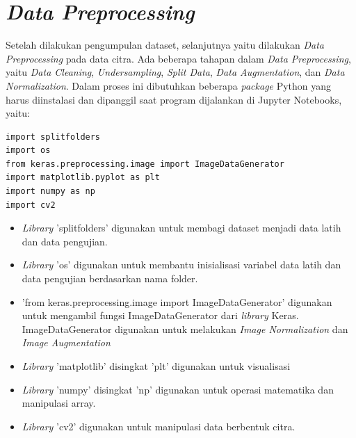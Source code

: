 \section{\textit{Data Preprocessing}}
Setelah dilakukan pengumpulan dataset, selanjutnya yaitu dilakukan \textit{Data Preprocessing} pada data citra. Ada beberapa tahapan dalam \textit{Data Preprocessing}, yaitu \textit{Data Cleaning}, \textit{Undersampling}, \textit{Split Data}, \textit{Data Augmentation}, dan \textit{Data Normalization}. Dalam proses ini dibutuhkan beberapa \textit{package} Python yang harus diinstalasi dan dipanggil saat program dijalankan di Jupyter Notebooks, yaitu:

\begin{lstlisting}[style=customc]
import splitfolders
import os
from keras.preprocessing.image import ImageDataGenerator
import matplotlib.pyplot as plt
import numpy as np
import cv2
\end{lstlisting}

\begin{itemize}
    \item \textit{Library} 'splitfolders' digunakan untuk membagi dataset menjadi data latih dan data pengujian.
    \item \textit{Library} 'os' digunakan untuk membantu inisialisasi variabel data latih dan data pengujian berdasarkan nama folder.
    \item 'from keras.preprocessing.image import ImageDataGenerator' digunakan untuk mengambil fungsi ImageDataGenerator dari \textit{library} Keras. ImageDataGenerator digunakan untuk melakukan \textit{Image Normalization} dan \textit{Image Augmentation}
    \item \textit{Library} 'matplotlib' disingkat 'plt' digunakan untuk visualisasi
    \item \textit{Library} 'numpy' disingkat 'np' digunakan untuk operasi matematika dan manipulasi array.
    \item \textit{Library} 'cv2' digunakan untuk manipulasi data berbentuk citra.
\end{itemize}

